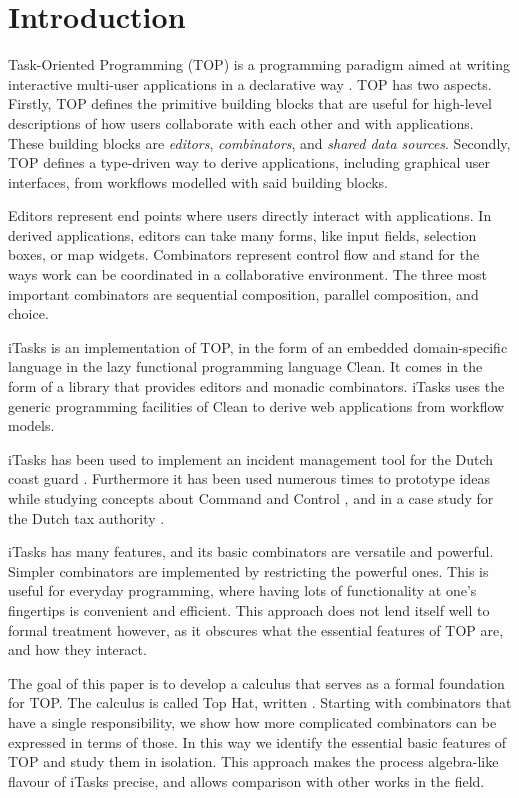 
\section{Introduction}

Task-Oriented Programming (TOP) is a programming paradigm aimed at writing interactive multi-user applications in a declarative way \cite{conf/ppdp/PlasmeijerLMAK12}.
TOP has two aspects.
Firstly, TOP defines the primitive building blocks that are useful for high-level descriptions of how users collaborate with each other and with applications.
These building blocks are \emph{editors}, \emph{combinators}, and \emph{shared data sources}.
Secondly, TOP defines a type-driven way to derive applications, including graphical user interfaces, from workflows modelled with said building blocks.

Editors represent end points where users directly interact with applications.
In derived applications, editors can take many forms, like input fields, selection boxes, or map widgets.
Combinators represent control flow and stand for the ways work can be coordinated in a collaborative environment.
The three most important combinators are sequential composition, parallel composition, and choice.

iTasks is an implementation of TOP, in the form of an embedded domain-specific language in the lazy functional programming language Clean.
It comes in the form of a library that provides editors and monadic combinators.
iTasks uses the generic programming facilities of Clean to derive web applications from workflow models.

iTasks has been used to implement an incident management tool for the Dutch coast guard \cite{conf/iscram/LijnseJP12}.
Furthermore it has been used numerous times to prototype ideas while studying concepts about Command and Control \cite{theses/nlda/Kool17, theses/radboud/Stutterheim17}, and in a case study for the Dutch tax authority \cite{conf/sfp/StutterheimAP17}.

iTasks has many features, and its basic combinators are versatile and powerful.
Simpler combinators are implemented by restricting the powerful ones.
This is useful for everyday programming, where having lots of functionality at one's fingertips is convenient and efficient.
This approach does not lend itself well to formal treatment however, as it obscures what the essential features of TOP are, and how they interact.

The goal of this paper is to develop a calculus that serves as a formal foundation for TOP.
The calculus is called Top Hat, written \tophat.
Starting with combinators that have a single responsibility, we show how more complicated combinators can be expressed in terms of those.
In this way we identify the essential basic features of TOP and study them in isolation.
This approach makes the process algebra-like flavour of iTasks precise, and allows comparison with other works in the field.

